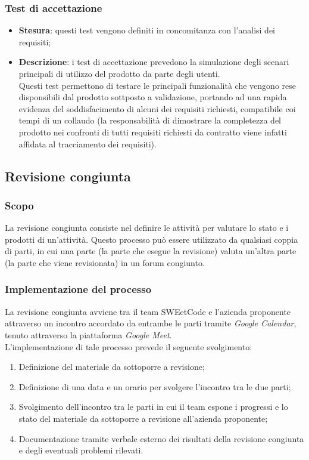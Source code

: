\documentclass[10pt, a4paper]{article}
\begin{document}
\subsubsection{Test di accettazione}
\begin{itemize}
    \item \textbf{Stesura}: questi test vengono definiti in concomitanza con l'analisi dei requisiti;
    \item \textbf{Descrizione}: i test di accettazione prevedono la simulazione degli scenari principali di utilizzo del prodotto da parte degli utenti.\\ 
    Questi test permettono di testare le principali funzionalità che vengono rese disponsibili dal prodotto sottposto a validazione, portando ad una
    rapida evidenza del soddisfacimento di alcuni dei requisiti richiesti, compatibile coi tempi di un collaudo (la responsabilità di dimostrare la completezza del 
    prodotto nei confronti di tutti requisiti richiesti da contratto viene infatti affidata al tracciamento dei requisiti).
    
\end{itemize}

\subsection{Revisione congiunta}

\subsubsection{Scopo}
La revisione congiunta consiste nel definire le attività per valutare lo stato e i prodotti di un'attività. Questo processo può 
essere utilizzato da qualsiasi coppia di parti, in cui una parte (la parte che esegue la revisione) valuta un'altra parte (la parte che viene 
revisionata) in un forum congiunto.

\subsubsection{Implementazione del processo}
La revisione congiunta avviene tra il team SWEetCode e l'azienda proponente attraverso un incontro accordato da entrambe le parti tramite \textit{Google Calendar},
tenuto attraverso la piattaforma \textit{Google Meet}.\\
L'implementazione di tale processo prevede il seguente svolgimento:
\begin{enumerate}
    \item Definizione del materiale da sottoporre a revisione;
    \item Definizione di una data e un orario per svolgere l'incontro tra le due parti;
    \item Svolgimento dell'incontro tra le parti in cui il team espone i progressi e lo stato del materiale da sottoporre a revisione all'azienda 
    proponente;
    \item Documentazione tramite verbale esterno dei risultati della revisione congiunta e degli eventuali problemi rilevati.
\end{enumerate}
\end{document}
